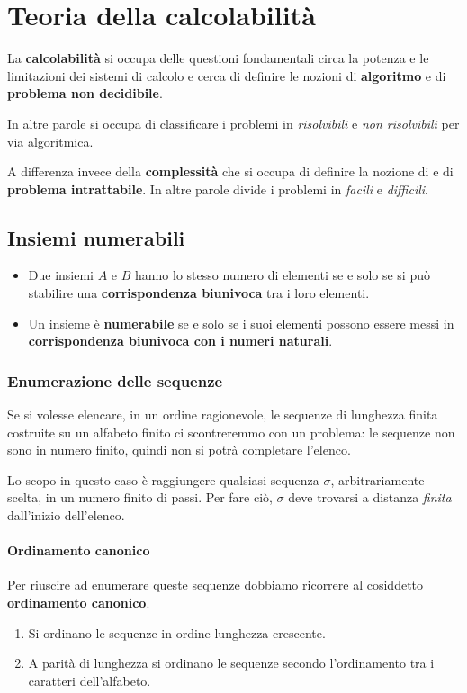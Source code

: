 \chapter{Teoria della calcolabilit\`a}
La \textbf{calcolabilit\`a} si occupa delle questioni fondamentali circa la potenza e le limitazioni dei sistemi di
calcolo e cerca di definire le nozioni di \textbf{algoritmo} e di \textbf{problema non decidibile}.

In altre parole si occupa di classificare i problemi in \emph{risolvibili} e \emph{non risolvibili} per via algoritmica.

A differenza invece della \textbf{complessit\`a} che si occupa di definire la nozione di 
e di \textbf{problema intrattabile}.  In altre parole divide i problemi in \emph{facili} e \emph{difficili}.

\section{Insiemi numerabili}
\begin{itemize}
	\item Due insiemi $A$ e $B$ hanno lo stesso numero di elementi se e solo se si pu\`o stabilire una
	      \textbf{corrispondenza biunivoca} tra i loro elementi.
	\item Un insieme \`e \textbf{numerabile} se e solo se i suoi elementi possono essere messi in
	      \textbf{corrispondenza biunivoca con i numeri naturali}.
\end{itemize}

\subsection{Enumerazione delle sequenze}
Se si volesse elencare, in un ordine ragionevole, le sequenze di lunghezza finita costruite su un alfabeto finito ci
scontreremmo con un problema: le sequenze non sono in numero finito, quindi non si potr\`a completare l'elenco.

Lo scopo in questo caso \`e raggiungere qualsiasi sequenza $\sigma$, arbitrariamente scelta, in un numero finito di passi.
Per fare ci\`o, $\sigma$ deve trovarsi a distanza \emph{finita} dall'inizio dell'elenco.

\subsubsection{Ordinamento canonico}
Per riuscire ad enumerare queste sequenze dobbiamo ricorrere al cosiddetto \textbf{ordinamento canonico}.
\begin{enumerate}
	\item Si ordinano le sequenze in ordine lunghezza crescente.
	\item A parit\`a di lunghezza si ordinano le sequenze secondo l'ordinamento tra i caratteri dell'alfabeto.
\end{enumerate}

